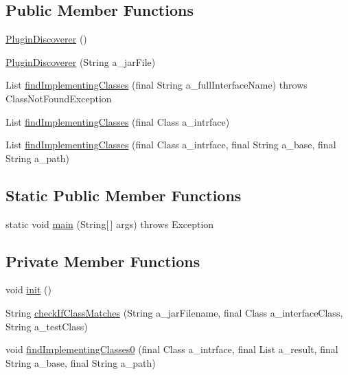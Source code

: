 \subsection*{Public Member Functions}
\begin{DoxyCompactItemize}
\item 
\hyperlink{classorg_1_1jgap_1_1util_1_1_plugin_discoverer_acd0356075ba9149924a9341101c0e6ed}{Plugin\-Discoverer} ()
\item 
\hyperlink{classorg_1_1jgap_1_1util_1_1_plugin_discoverer_ac8235b0726b35f80e0bacddeed96b9a8}{Plugin\-Discoverer} (String a\-\_\-jar\-File)
\item 
List \hyperlink{classorg_1_1jgap_1_1util_1_1_plugin_discoverer_a2364ca4f685f61ab1bb3d9594280812b}{find\-Implementing\-Classes} (final String a\-\_\-full\-Interface\-Name)  throws Class\-Not\-Found\-Exception 
\item 
List \hyperlink{classorg_1_1jgap_1_1util_1_1_plugin_discoverer_aa1acd7c75cf00693df86c53712ec5e6d}{find\-Implementing\-Classes} (final Class a\-\_\-intrface)
\item 
List \hyperlink{classorg_1_1jgap_1_1util_1_1_plugin_discoverer_a398c250ba353fb77f49596c7d2d7d578}{find\-Implementing\-Classes} (final Class a\-\_\-intrface, final String a\-\_\-base, final String a\-\_\-path)
\end{DoxyCompactItemize}
\subsection*{Static Public Member Functions}
\begin{DoxyCompactItemize}
\item 
static void \hyperlink{classorg_1_1jgap_1_1util_1_1_plugin_discoverer_a2c2dd0dca32f171eed6e8452362645a8}{main} (String\mbox{[}$\,$\mbox{]} args)  throws Exception 
\end{DoxyCompactItemize}
\subsection*{Private Member Functions}
\begin{DoxyCompactItemize}
\item 
void \hyperlink{classorg_1_1jgap_1_1util_1_1_plugin_discoverer_a057e96e50cce44c736b93c0f89b682a0}{init} ()
\item 
String \hyperlink{classorg_1_1jgap_1_1util_1_1_plugin_discoverer_a01eafe900cd1820c78039597272fcd86}{check\-If\-Class\-Matches} (String a\-\_\-jar\-Filename, final Class a\-\_\-interface\-Class, String a\-\_\-test\-Class)
\item 
void \hyperlink{classorg_1_1jgap_1_1util_1_1_plugin_discoverer_aa9454f104245321f720e9592105b397a}{find\-Implementing\-Classes0} (final Class a\-\_\-intrface, final List a\-\_\-result, final String a\-\_\-base, final String a\-\_\-path)
\end{DoxyCompactItemize}
